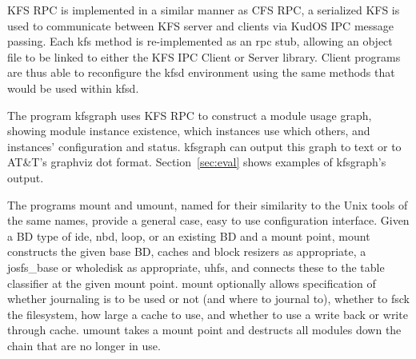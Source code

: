 KFS RPC is implemented in a similar manner as CFS RPC, a serialized
KFS is used to communicate between KFS server and clients via KudOS
IPC message passing. Each kfs method is re-implemented as an rpc stub,
allowing an object file to be linked to either the KFS IPC Client or
Server library. Client programs are thus able to reconfigure the kfsd
environment using the same methods that would be used within kfsd.

The program kfsgraph uses KFS RPC to construct a module usage graph,
showing module instance existence, which instances use which others,
and instances' configuration and status. kfsgraph can output this
graph to text or to AT\&T's graphviz dot
format. Section~\ref{sec:eval} shows examples of kfsgraph's output.

The programs mount and umount, named for their similarity to the
Unix tools of the same names, provide a general case, easy to use
configuration interface. Given a BD type of ide, nbd, loop, or an existing
BD and a mount point, mount constructs the given base BD, caches and block
resizers as appropriate, a josfs\_base or wholedisk as appropriate, uhfs,
and connects these to the table classifier at the given mount point. mount
optionally allows specification of whether journaling is to be used or not
(and where to journal to), whether to fsck the filesystem, how large a cache
to use, and whether to use a write back or write through cache. umount takes
a mount point and destructs all modules down the chain that are no longer
in use.

